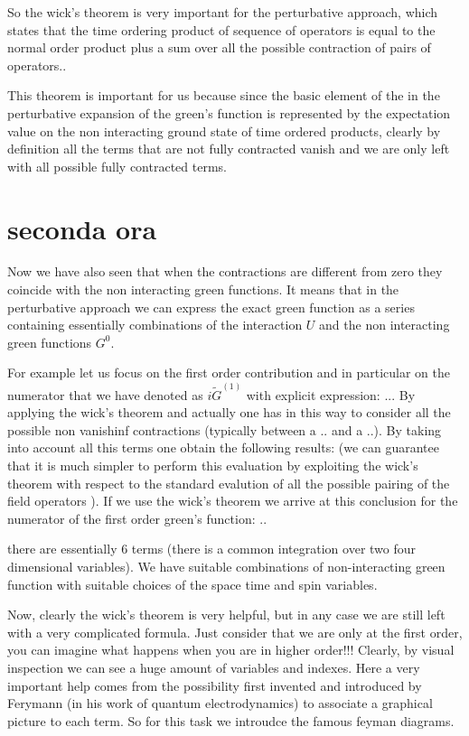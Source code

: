 \documentclass[../main/main.tex]{subfiles}
\begin{document}
So the wick's theorem is very important for the perturbative approach, which states that the time ordering product of sequence of operators is equal to the normal order product plus a sum over all the possible contraction of pairs of operators..

This theorem is important for us because since the basic element of the in the perturbative expansion of the green's function is represented by the expectation value on the non interacting ground state of time ordered products, clearly by definition all the terms that are not fully contracted vanish and we are only left with all possible fully contracted terms.


\section{seconda ora}

Now we have also seen that when the contractions are different from zero they coincide with the non interacting green functions. It means that in the perturbative approach we can express the exact green function as a series containing essentially combinations of the interaction \( U \) and the non interacting green functions \( G^0 \).

For example let us focus on the first order contribution and in particular on the numerator that we have denoted as \( i \widetilde{G} ^{(1)} \) with explicit expression:
...
By applying the wick's theorem and actually one has in this way to consider all the possible non vanishinf contractions (typically between a .. and a ..). By taking into account all this terms one obtain the following results: (we can guarantee that it is much simpler to perform this evaluation by exploiting the wick's theorem with respect to the standard evalution of all the possible pairing of the field operators ). If we use the wick's theorem we arrive at this conclusion for the numerator of the first order green's function:
..

there are essentially 6 terms (there is a common integration over two four dimensional variables). We have suitable combinations of non-interacting green function with suitable choices of the space time and spin variables.

Now, clearly the wick's theorem is very helpful, but in any case we are still left with a very complicated formula. Just consider that we are only at the first order, you can imagine what happens when you are in higher order!!!
Clearly, by visual inspection we can see a huge amount of variables and indexes. Here a very important help comes from the possibility first invented and introduced by Ferymann (in his work of quantum electrodynamics) to associate a graphical picture to each term. So for this task we introudce the famous feyman diagrams.
\end{document}
